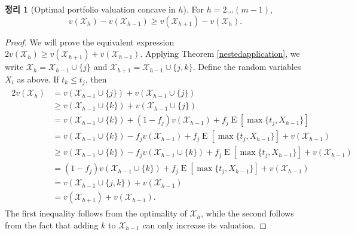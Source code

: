 \documentclass[12pt]{article} %
\newtheorem{theorem}{Theorem}
\theoremstyle{definition}
\newtheorem{theorem}{정리}
\theoremstyle{definition}
\begin{document}
\begin{theorem}[Optimal portfolio valuation concave in $h$] \label{concavityinh}
For $h = 2 \dots (m-1)$, \begin{equation}v(\mathcal{X}_h) - v(\mathcal{X}_{h-1}) \geq v(\mathcal{X}_{h+1}) - v(\mathcal{X}_{h}).\end{equation} 
\end{theorem}
\begin{proof}
We will prove the equivalent expression $2 v(\mathcal{X}_h) \geq v(\mathcal{X}_{h+1}) + v(\mathcal{X}_{h-1})$. Applying Theorem \ref{nestedapplication}, we write $\mathcal{X}_h = \mathcal{X}_{h-1} \cup\{j\}$ and $\mathcal{X}_{h+1} = \mathcal{X}_{h-1} \cup\{j, k\}$. Define the random variables $X_i$ as above. If $t_k \leq t_j$, then 
\begin{align}
\begin{split}
2 v(\mathcal{X}_h) &= v(\mathcal{X}_{h-1} \cup\{j\}) + v(\mathcal{X}_{h-1} \cup\{j\}) \\
&\geq v(\mathcal{X}_{h-1} \cup\{k\}) + v(\mathcal{X}_{h-1} \cup\{j\}) \\
&= v(\mathcal{X}_{h-1} \cup\{k\}) + (1 - f_j) v(\mathcal{X}_{h-1}) + f_j \operatorname{E}[\max\{t_j, X_{h-1}\}] \\
&= v(\mathcal{X}_{h-1} \cup\{k\}) - f_j v(\mathcal{X}_{h-1}) + f_j \operatorname{E}[\max\{t_j, X_{h-1}\}] + v(\mathcal{X}_{h-1})  \\
&\geq v(\mathcal{X}_{h-1} \cup\{k\})  - f_j v(\mathcal{X}_{h-1}\cup\{k\}) + f_j \operatorname{E}[\max\{t_j, X_{h-1}\}]+ v(\mathcal{X}_{h-1})\\
&= (1 - f_j) v(\mathcal{X}_{h-1} \cup\{k\})  + f_j \operatorname{E}[\max\{t_j, X_{h-1}\}]+ v(\mathcal{X}_{h-1})\\
&=  v(\mathcal{X}_{h-1} \cup\{j, k\}) + v(\mathcal{X}_{h-1})\\
&=  v(\mathcal{X}_{h+1}) + v(\mathcal{X}_{h-1}).
\end{split} 
\end{align}
The first inequality follows from the optimality of $\mathcal{X}_h$, while the second follows from the fact that adding $k$ to $\mathcal{X}_{h-1}$ can only increase its valuation.


\end{proof}
\end{document}
